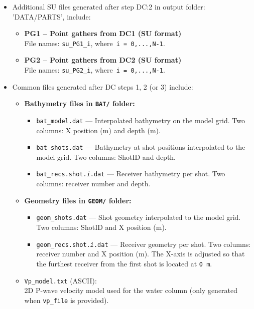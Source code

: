 \documentclass[11pt, oneside]{article}   	%
\begin{document}
\begin{itemize}
\item Additional SU files generated after step DC:2 in output folder: 'DATA/PARTS', include:

\begin{itemize}
    \item \textbf{PG1 – Point gathers from DC1 (SU format)}\\
    File names: \texttt{su\_PG1\_i}, where~\texttt{i = 0,...,N-1}.

    \item \textbf{PG2 – Point gathers from DC2 (SU format)}\\
    File names: \texttt{su\_PG2\_i}, where~\texttt{i = 0,...,N-1}.
\end{itemize}

\item Common files generated after DC steps 1, 2 (or 3) include:

\begin{itemize}
    \item \textbf{Bathymetry files in \texttt{BAT/} folder:}
    \begin{itemize}
        \item \texttt{bat\_model.dat} — Interpolated bathymetry on the model grid. Two columns: X position (m) and depth (m).
        \item \texttt{bat\_shots.dat} — Bathymetry at shot positions interpolated to the model grid. Two columns: ShotID and depth.
        \item \texttt{bat\_recs.shot.\textit{i}.dat} — Receiver bathymetry per shot. Two columns: receiver number and depth.
    \end{itemize}

    \item \textbf{Geometry files in \texttt{GEOM/} folder:}
    \begin{itemize}
        \item \texttt{geom\_shots.dat} — Shot geometry interpolated to the model grid. Two columns: ShotID and X position (m).
        \item \texttt{geom\_recs.shot.\textit{i}.dat} — Receiver geometry per shot. Two columns: receiver number and X position (m). The X-axis is adjusted so that the furthest receiver from the first shot is located at \texttt{0 m}.
    \end{itemize}

    \item \texttt{Vp\_model.txt} (ASCII):\\
    2D P-wave velocity model used for the water column (only generated when \texttt{vp\_file} is provided).
    
    \end{itemize}

    
\end{itemize}
\end{document}
